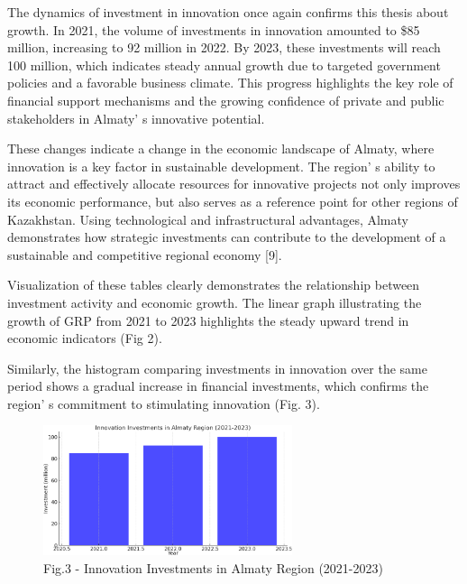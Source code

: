 \begin{multicols}{2}
The dynamics of investment in innovation once again confirms this thesis
about growth. In 2021, the volume of investments in innovation amounted
to \$85 million, increasing to 92 million in 2022. By 2023, these
investments will reach 100 million, which indicates steady annual growth
due to targeted government policies and a favorable business climate.
This progress highlights the key role of financial support mechanisms
and the growing confidence of private and public stakeholders in
Almaty' s innovative potential.

These changes indicate a change in the economic landscape of Almaty,
where innovation is a key factor in sustainable development. The
region' s ability to attract and effectively allocate
resources for innovative projects not only improves its economic
performance, but also serves as a reference point for other regions of
Kazakhstan. Using technological and infrastructural advantages, Almaty
demonstrates how strategic investments can contribute to the development
of a sustainable and competitive regional economy {[}9{]}.

Visualization of these tables clearly demonstrates the relationship
between investment activity and economic growth. The linear graph
illustrating the growth of GRP from 2021 to 2023 highlights the steady
upward trend in economic indicators (Fig 2).

Similarly, the histogram comparing investments in innovation over the
same period shows a gradual increase in financial investments, which
confirms the region' s commitment to stimulating
innovation (Fig. 3).
\end{multicols}

\begin{figure}[H]
	\centering
	\includegraphics[width=0.65\textwidth]{media/ekon/image5}
	\caption*{Fig.3 - Innovation Investments in Almaty Region (2021-2023)}
\end{figure}

